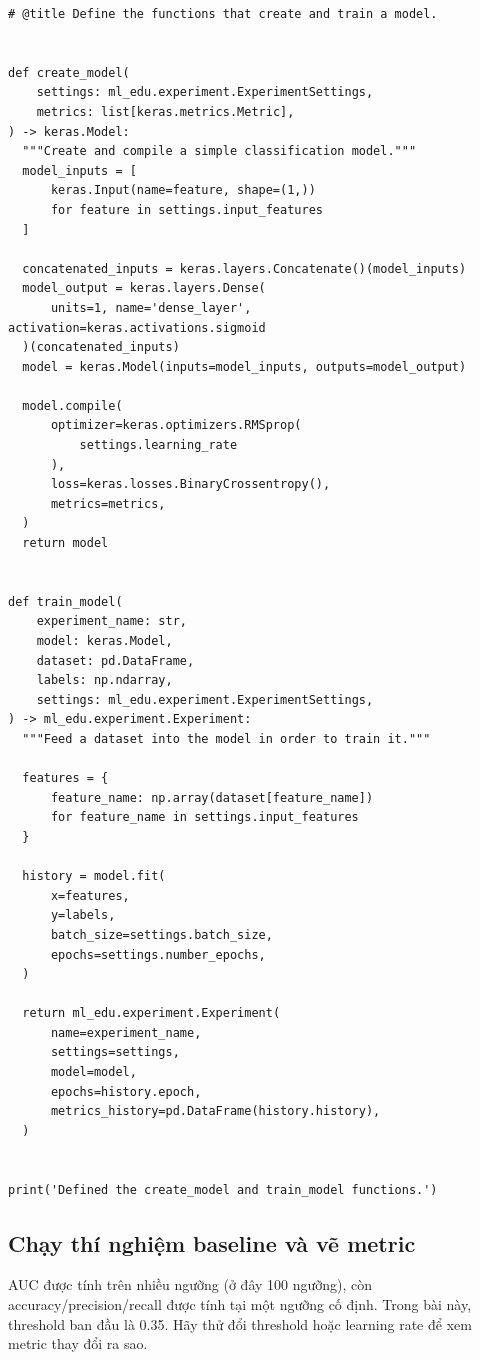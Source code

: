 \documentclass[12pt,a4paper]{article}
\begin{document}
\begin{lstlisting}
# @title Define the functions that create and train a model.


def create_model(
    settings: ml_edu.experiment.ExperimentSettings,
    metrics: list[keras.metrics.Metric],
) -> keras.Model:
  """Create and compile a simple classification model."""
  model_inputs = [
      keras.Input(name=feature, shape=(1,))
      for feature in settings.input_features
  ]

  concatenated_inputs = keras.layers.Concatenate()(model_inputs)
  model_output = keras.layers.Dense(
      units=1, name='dense_layer', activation=keras.activations.sigmoid
  )(concatenated_inputs)
  model = keras.Model(inputs=model_inputs, outputs=model_output)

  model.compile(
      optimizer=keras.optimizers.RMSprop(
          settings.learning_rate
      ),
      loss=keras.losses.BinaryCrossentropy(),
      metrics=metrics,
  )
  return model


def train_model(
    experiment_name: str,
    model: keras.Model,
    dataset: pd.DataFrame,
    labels: np.ndarray,
    settings: ml_edu.experiment.ExperimentSettings,
) -> ml_edu.experiment.Experiment:
  """Feed a dataset into the model in order to train it."""

  features = {
      feature_name: np.array(dataset[feature_name])
      for feature_name in settings.input_features
  }

  history = model.fit(
      x=features,
      y=labels,
      batch_size=settings.batch_size,
      epochs=settings.number_epochs,
  )

  return ml_edu.experiment.Experiment(
      name=experiment_name,
      settings=settings,
      model=model,
      epochs=history.epoch,
      metrics_history=pd.DataFrame(history.history),
  )


print('Defined the create_model and train_model functions.')
\end{lstlisting}

\subsection{Chạy thí nghiệm baseline và vẽ metric}

\begin{dongco}[title={Metric và threshold}]
AUC được tính trên nhiều ngưỡng (ở đây 100 ngưỡng), còn accuracy/precision/recall được tính tại một ngưỡng cố định.
Trong bài này, threshold ban đầu là 0.35. Hãy thử đổi threshold hoặc learning rate để xem metric thay đổi ra sao.
\end{dongco}
\end{document}

